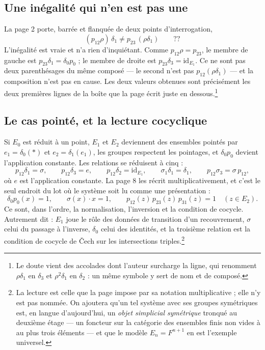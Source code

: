 \documentclass[11pt,a4paper]{article}
\begin{document}
\subsection*{Une inégalité qui n'en est pas une}

La page 2 porte, barrée et flanquée de deux points d'interrogation,
\[
  (p_{12}\rho)\,\delta_{1} \neq p_{23}\,(\rho\delta_{1}) \qquad ??
\]
L'inégalité est vraie et n'a rien d'inquiétant. Comme $p_{12}\rho = p_{23}$, le
membre de gauche est $p_{23}\delta_{1} = \delta_{0}p_{0}$ ; le membre de droite
est $p_{23}\delta_{3} = \mathrm{id}_{E_{1}}$. Ce ne sont pas deux
parenthésages du même composé — le second n'est pas
$p_{12}(\rho\delta_{1})$ — et la composition n'est pas en cause. Les deux
valeurs obtenues sont précisément les deux premières lignes de la boîte que la
page écrit juste en dessous.\footnote{Le doute vient des accolades dont l'auteur
surcharge la ligne, qui renomment $\rho\delta_{1}$ en $\delta_{3}$ et
$\rho^{2}\delta_{1}$ en $\delta_{2}$ : un même symbole y sert de nom et de
composé.}

\subsection*{Le cas pointé, et la lecture cocyclique}

Si $E_{0}$ est réduit à un point, $E_{1}$ et $E_{2}$ deviennent des ensembles
pointés par $e_{1} = \delta_{0}(*)$ et $e_{2} = \delta_{1}(e_{1})$, les groupes
respectent les pointages, et $\delta_{0}p_{0}$ devient l'application constante.
Les relations se réduisent à cinq :
\[
  p_{12}\delta_{1} = \sigma, \qquad
  p_{12}\delta_{3} = e, \qquad
  p_{12}\delta_{2} = \mathrm{id}_{E_{1}}, \qquad
  \sigma_{1}\delta_{1} = \delta_{1}, \qquad
  p_{12}\sigma_{3} = \sigma\,p_{12},
\]
où $e$ est l'application constante. La page 8 les récrit multiplicativement,
et c'est le seul endroit du lot où le système soit lu comme une présentation :
\[
  \delta_{0}p_{0}(x) = 1, \qquad
  \sigma(x)\cdot x = 1, \qquad
  p_{12}(z)\,p_{23}(z)\,p_{31}(z) = 1 \quad (z \in E_{2}).
\]
Ce sont, dans l'ordre, la normalisation, l'inversion et la condition de
cocycle. Autrement dit : $E_{1}$ joue le rôle des données de transition d'un
recouvrement, $\sigma$ celui du passage à l'inverse, $\delta_{0}$ celui des
identités, et la troisième relation est la condition de cocycle de Čech sur les
intersections triples.\footnote{La lecture est celle que la page impose par sa
notation multiplicative ; elle n'y est pas nommée. On ajoutera qu'un tel système
avec ses groupes symétriques est, en langue d'aujourd'hui, un \emph{objet
simplicial symétrique} tronqué au deuxième étage — un foncteur sur la catégorie
des ensembles finis non vides à au plus trois éléments — et que le modèle
$E_{n} = F^{n+1}$ en est l'exemple universel.}
\end{document}
